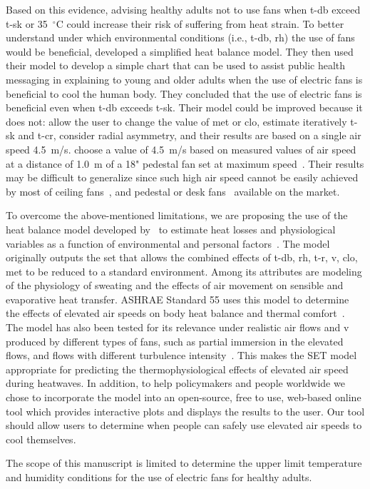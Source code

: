Based on this evidence, advising healthy adults not to use fans when \ac{t-db} exceed \ac{t-sk} or 35~$^{\circ}$C could increase their risk of suffering from heat strain.
To better understand under which environmental conditions (i.e., \ac{t-db}, \ac{rh}) the use of fans would be beneficial,  developed a simplified heat balance model.
They then used their model to develop a simple chart that can be used to assist public health messaging in explaining to young and older adults when the use of electric fans is beneficial to cool the human body.
They concluded that the use of electric fans is beneficial even when \ac{t-db} exceeds \ac{t-sk}.
Their model could be improved because it does not: allow the user to change the value of \ac{met} or \ac{clo}, estimate iteratively \ac{t-sk} and \ac{t-cr}, consider radial asymmetry, and their results are based on a single air speed 4.5~m/s.
 choose a value of 4.5~m/s based on measured values of air speed at a distance of 1.0~m of a 18" pedestal fan set at maximum speed~\cite{Jay2015}.
Their results may be difficult to generalize since such high air speed cannot be easily achieved by most of ceiling fans~\cite{Raftery2019}, and pedestal or desk fans~\cite{Yang2015a} available on the market.

To overcome the above-mentioned limitations, we are proposing the use of the heat balance model developed by~ to estimate heat losses and physiological variables as a function of environmental and personal factors~\cite{Gagge1986}.
The model originally outputs the \ac{set} that allows the combined effects of \ac{t-db}, \ac{rh}, \ac{t-r}, \ac{v}, \ac{clo}, \ac{met} to be reduced to a standard environment.
Among its attributes are modeling of the physiology of sweating and the effects of air movement on sensible and evaporative heat transfer.
ASHRAE Standard 55 uses this model to determine the effects of elevated air speeds on body heat balance and thermal comfort~\cite{ashrae552017}.
The model has also been tested for its relevance under realistic air flows and \ac{v} produced by different types of fans, such as partial immersion in the elevated flows, and flows with different turbulence intensity~\cite{Huang2014}.
This makes the SET model appropriate for predicting the thermophysiological effects of elevated air speed during heatwaves.
In addition, to help policymakers and people worldwide we chose to incorporate the model into an open-source, free to use, web-based online tool which provides interactive plots and displays the results to the user.
Our tool should allow users to determine when people can safely use elevated air speeds to cool themselves.

The scope of this manuscript is limited to determine the upper limit temperature and humidity conditions for the use of electric fans for healthy adults.